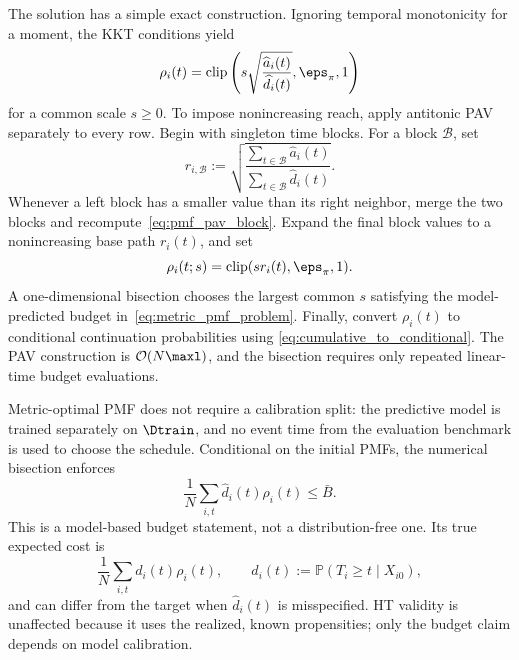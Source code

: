 The solution has a simple exact construction.  Ignoring temporal monotonicity
for a moment, the KKT conditions yield
\begin{equation}
    \rho_i(t)
    =\operatorname{clip}
      \left(s\sqrt{\frac{\widehat a_i(t)}{\widehat d_i(t)}},
      \eps_\pi,1\right)
    \label{eq:pmf_unpooled_solution}
\end{equation}
for a common scale $s\geq0$.  To impose nonincreasing reach, apply antitonic
PAV separately to every row.  Begin with singleton time blocks.  For a block
$\mathcal{B}$, set
\begin{equation}
    r_{i,\mathcal{B}}
    :=\sqrt{
      \frac{\sum_{t\in\mathcal{B}}\widehat a_i(t)}
           {\sum_{t\in\mathcal{B}}\widehat d_i(t)}
    }.
    \label{eq:pmf_pav_block}
\end{equation}
Whenever a left block has a smaller value than its right neighbor, merge the
two blocks and recompute~\eqref{eq:pmf_pav_block}.  Expand the final block
values to a nonincreasing base path $r_i(t)$, and set
\begin{equation}
    \rho_i(t;s)=\operatorname{clip}(sr_i(t),\eps_\pi,1).
    \label{eq:pmf_scaled_path}
\end{equation}
A one-dimensional bisection chooses the largest common $s$ satisfying the
model-predicted budget in~\eqref{eq:metric_pmf_problem}.  Finally, convert
$\rho_i(t)$ to conditional continuation probabilities using
\eqref{eq:cumulative_to_conditional}.  The PAV construction is
$\mathcal{O}(N\maxl)$, and the bisection requires only repeated linear-time
budget evaluations.

Metric-optimal PMF does not require a calibration split: the predictive model
is trained separately on $\Dtrain$, and no event time from the evaluation
benchmark is used to choose the schedule.  Conditional on the initial PMFs,
the numerical bisection enforces
\begin{equation}
    \frac{1}{N}\sum_{i,t}\widehat d_i(t)\rho_i(t)\leq\bar B.
\end{equation}
This is a model-based budget statement, not a distribution-free one.  Its
true expected cost is
\begin{equation}
    \frac{1}{N}\sum_{i,t}d_i(t)\rho_i(t),
    \qquad
    d_i(t):=\mathbb P(T_i\geq t\mid X_{i0}),
\end{equation}
and can differ from the target when $\widehat d_i(t)$ is misspecified.  HT
validity is unaffected because it uses the realized, known propensities; only
the budget claim depends on model calibration.

